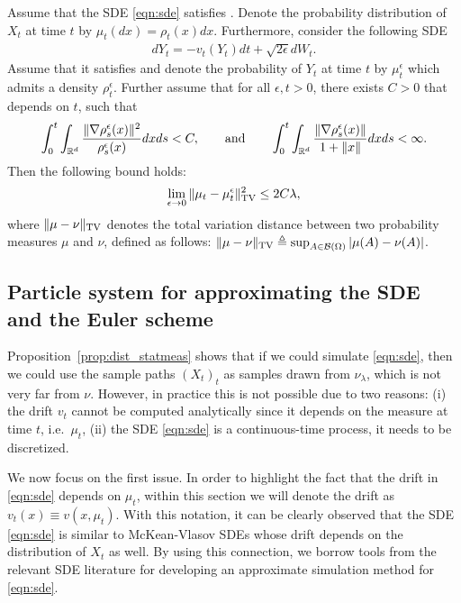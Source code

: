 \begin{prop}
\label{prop:dist_statmeas}
Assume that the SDE \eqref{eqn:sde} satisfies . Denote the probability distribution of $X_t$ at time $t$ by $\mu_t(dx) = \rho_t (x) dx$. Furthermore, consider the following SDE
\begin{align}
d Y_t = - v_t(Y_t) dt + \sqrt{2 \epsilon } d W_t. \label{eqn:sde_eps}
\end{align}
Assume that it satisfies  and denote the probability of $Y_t$ at time $t$ by $\mu^\epsilon_t$ which admits a density $\rho^\epsilon_t$. Further assume that for all $\epsilon,t>0$, there exists $C >0$ that depends on $t$, such that
\begin{align}
\int_{0}^t \int_{\mathbb{R}^d} \frac{\|\nabla \rho^\epsilon_s(x) \|^2}{\rho^\epsilon_s(x)} dx ds <C, \qquad \text{and} \qquad \int_{0}^t \int_{\mathbb{R}^d}  \frac{\|\nabla \rho^\epsilon_s(x)\|}{1+\|x\|} dx ds <\infty.
\end{align}
Then the following bound holds:
\begin{align}
\lim_{\epsilon \rightarrow 0} \| \mu_t - \mu^\epsilon_t \|_{\textnormal{TV}}^2 \leq 2 C \lambda,
\end{align}
where $\|\mu-\nu\|_{\textnormal{TV}}$ denotes the total variation distance between two probability measures $\mu$ and $\nu$, defined as follows: $\|\mu-\nu\|_{\textnormal{TV}}\triangleq \sup_{A \in {\cal B}(\Omega)} |\mu(A) -\nu(A) |$.
\end{prop}

\subsection{Particle system for approximating the SDE and the Euler scheme}

Proposition~\ref{prop:dist_statmeas} shows that if we could simulate \eqref{eqn:sde}, then we could use the sample paths $(X_t)_t$ as
samples drawn from $\nu_\lambda$, which is not very far from $\nu$. However, in practice this is not possible due to two reasons: (i) the drift $v_t$ cannot be computed analytically since it depends on the measure at time $t$, i.e.\ $\mu_t$, (ii) the SDE \eqref{eqn:sde} is a continuous-time process, it needs to be discretized.  

We now focus on the first issue. In order to highlight the fact that the drift in \eqref{eqn:sde} depends on $\mu_t$, within this section we will denote the drift as $v_t(x) \equiv v(x, \mu_t)$. With this notation, it can be clearly observed that the SDE \eqref{eqn:sde} is similar to McKean-Vlasov SDEs \cite{veretennikov2006ergodic,mishura2016existence} whose drift depends on the distribution of $X_t$ as well. By using this connection, we borrow tools from the relevant SDE literature \cite{malrieu03,cgm-08} for developing an approximate simulation method for \eqref{eqn:sde}. 

